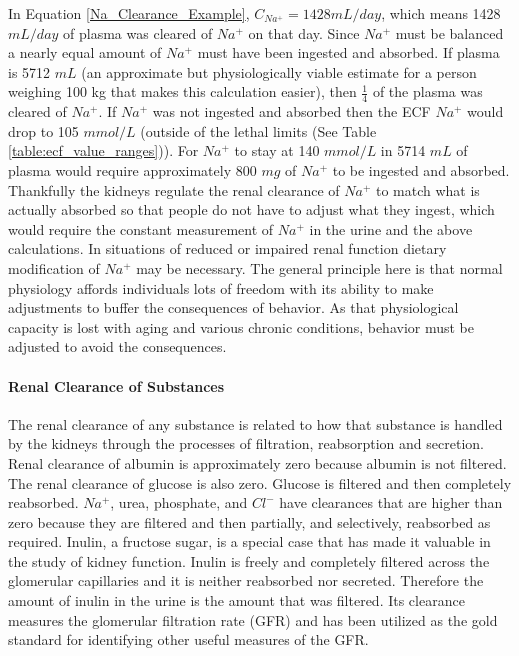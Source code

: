 In Equation \ref{Na_Clearance_Example}, $C_{Na^+} = 1428 mL/day$, which means 1428 $mL/day$ of plasma was cleared of $Na^+$ on that day. Since $Na^+$ must be balanced a nearly equal amount of $Na^+$ must have been ingested and absorbed. If plasma is 5712 $mL$ (an approximate but physiologically viable estimate for a person weighing 100 kg that makes this calculation easier), then $\frac{1}{4}$ of the plasma was cleared of $Na^+$. If $Na^+$ was not ingested and absorbed then the ECF $Na^+$ would drop to 105 $mmol/L$ (outside of the lethal limits (See Table \ref{table:ecf_value_ranges})). For $Na^+$ to stay at 140 $mmol/L$ in 5714 $mL$ of plasma would require approximately 800 $mg$ of $Na^+$ to be ingested and absorbed.\footnotemark{}
Thankfully the kidneys regulate the renal clearance of $Na^+$ to match what is actually absorbed so that people do not have to adjust what they ingest, which would require the constant measurement of $Na^+$ in the urine and the above calculations.\footnotemark{} In situations of reduced or impaired renal function dietary modification of $Na^+$ may be necessary. The general principle here is that normal physiology affords individuals lots of freedom with its ability to make adjustments to buffer the consequences of behavior. As that physiological capacity is lost with aging and various chronic conditions, behavior must be adjusted to avoid the consequences. 

\paragraph{Renal Clearance of Substances}

The renal clearance of any substance is related to how that substance is handled by the kidneys through the processes of filtration, reabsorption and secretion. Renal clearance of albumin is approximately zero because albumin is not filtered. The renal clearance of glucose is also zero. Glucose is filtered and then completely reabsorbed. $Na^+$, urea, phosphate, and $Cl^-$ have clearances that are higher than zero because they are filtered and then partially, and selectively, reabsorbed as required. Inulin, a fructose sugar, is a special case that has made it valuable in the study of kidney function. Inulin is freely and completely filtered across the glomerular capillaries and it is neither reabsorbed nor secreted. Therefore the amount of inulin in the urine is the amount that was filtered. Its clearance measures the glomerular filtration rate (GFR) and has been utilized as the gold standard for identifying other useful measures of the GFR.

